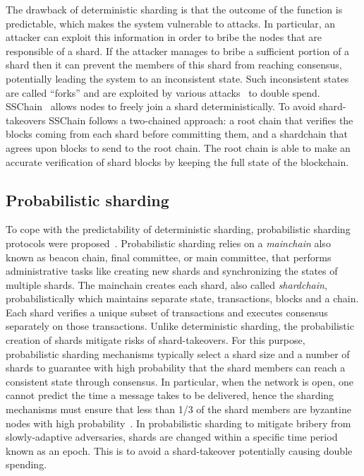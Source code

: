 \documentclass[11pt,dvipdfm]{article}
\begin{document}
The drawback of deterministic sharding is that the outcome of the function is predictable, which makes the system vulnerable to attacks.
In particular, an attacker can exploit this information in order to bribe the nodes that are responsible of a shard.
If the attacker manages to bribe a sufficient portion of a shard then it can prevent the members of this shard from reaching consensus, potentially leading the system to an inconsistent state. Such inconsistent states are called ``forks'' and are exploited by various attacks~\cite{NG17,EGJ20} to double spend.
SSChain~\cite{CHEN2019101055} allows nodes to freely join a shard deterministically. To avoid shard-takeovers SSChain follows a two-chained approach: a root chain that verifies the blocks coming from each shard before committing them, and a shardchain that agrees upon blocks to send to the root chain. The root chain is able to make an accurate verification of shard blocks by keeping the full state of the blockchain.

\subsection{Probabilistic sharding}
To cope with the predictability of deterministic sharding, probabilistic sharding protocols were proposed~\cite{KJGG17,LNZ16,ZMR18,Eth2}. Probabilistic sharding relies on a \emph{mainchain} also known as beacon chain, final committee, or main committee, that performs administrative tasks like creating new shards and synchronizing the states of multiple shards. The mainchain creates each shard, also called \emph{shardchain}, probabilistically which maintains separate state, transactions, blocks and a chain. Each shard verifies a unique subset of transactions and executes consensus separately on those transactions. Unlike deterministic sharding, the probabilistic creation of shards mitigate risks of shard-takeovers. 
%
For this purpose, probabilistic sharding mechanisms typically select a shard size and a number of shards to guarantee with high probability that the shard members can reach a consistent state through consensus. 
In particular, when the network is open, one cannot predict the time a message takes to be delivered, hence the sharding mechanisms must ensure that less than 1/3 of the shard members are byzantine nodes with high probability~\cite{DLS88}. 
In probabilistic sharding to mitigate bribery from slowly-adaptive adversaries, shards are changed within a specific time period known as an epoch. This is to avoid a shard-takeover potentially causing double spending.
\end{document}
